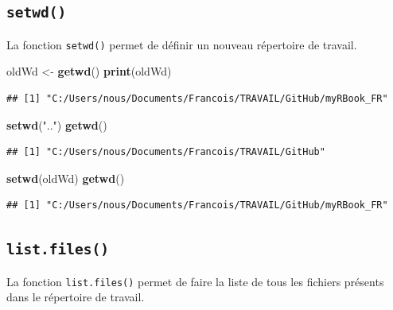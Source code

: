 \documentclass[
]{book}
\newenvironment{Shaded}{\begin{snugshade}}{\end{snugshade}}
\newcommand{\KeywordTok}[1]{\textcolor[rgb]{0.13,0.29,0.53}{\textbf{#1}}}
\newcommand{\NormalTok}[1]{#1}
\newcommand{\StringTok}[1]{\textcolor[rgb]{0.31,0.60,0.02}{#1}}
\begin{document}
\hypertarget{l015setwd}{%
\subsection{\texorpdfstring{\texttt{setwd()}}{setwd()}}\label{l015setwd}}

La fonction \texttt{setwd()} permet de définir un nouveau répertoire de travail.

\begin{Shaded}
\begin{Highlighting}[]
\NormalTok{oldWd <-}\StringTok{ }\KeywordTok{getwd}\NormalTok{()}
\KeywordTok{print}\NormalTok{(oldWd)}
\end{Highlighting}
\end{Shaded}

\begin{verbatim}
## [1] "C:/Users/nous/Documents/Francois/TRAVAIL/GitHub/myRBook_FR"
\end{verbatim}

\begin{Shaded}
\begin{Highlighting}[]
\KeywordTok{setwd}\NormalTok{(}\StringTok{".."}\NormalTok{)}
\KeywordTok{getwd}\NormalTok{()}
\end{Highlighting}
\end{Shaded}

\begin{verbatim}
## [1] "C:/Users/nous/Documents/Francois/TRAVAIL/GitHub"
\end{verbatim}

\begin{Shaded}
\begin{Highlighting}[]
\KeywordTok{setwd}\NormalTok{(oldWd)}
\KeywordTok{getwd}\NormalTok{()}
\end{Highlighting}
\end{Shaded}

\begin{verbatim}
## [1] "C:/Users/nous/Documents/Francois/TRAVAIL/GitHub/myRBook_FR"
\end{verbatim}

\hypertarget{l015listfiles}{%
\subsection{\texorpdfstring{\texttt{list.files()}}{list.files()}}\label{l015listfiles}}

La fonction \texttt{list.files()} permet de faire la liste de tous les fichiers présents dans le répertoire de travail.
\end{document}
